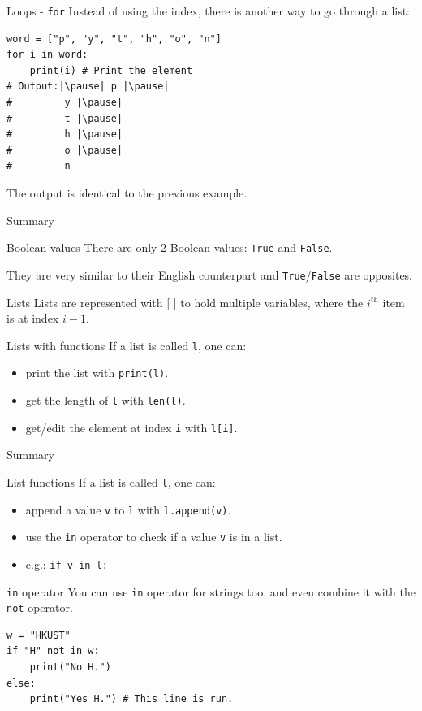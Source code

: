 \documentclass[dvipsnames, svgnames, x11names]{beamer}
\begin{document}
\begin{frame}[fragile]{Loops - \texttt{for}}
Instead of using the index, there is another way to go through a list:
\begin{verbatim}
word = ["p", "y", "t", "h", "o", "n"]
for i in word:
    print(i) # Print the element
# Output:|\pause| p |\pause|
#         y |\pause|
#         t |\pause|
#         h |\pause|
#         o |\pause|
#         n
\end{verbatim}
\pause The output is identical to the previous example.
\end{frame}

\begin{frame}[fragile]{Summary}
\begin{block}{Boolean values}
There are only 2 Boolean values: \texttt{True} and \texttt{False}.

They are very similar to their English counterpart and \texttt{True}/\texttt{False} are opposites.
\end{block}
\begin{block}{Lists}
Lists are represented with [ ] to hold multiple variables, where the $i^{\text{th}}$ item is at index $i - 1$.\\
\end{block}
\begin{block}{Lists with functions}
If a list is called \texttt{l}, one can:
\begin{itemize}
    \item print the list with \texttt{print(l)}.
    \item get the length of \texttt{l} with \texttt{len(l)}.
    \item get/edit the element at index \texttt{i} with \texttt{l[i]}.
\end{itemize}
\end{block}
\end{frame}

\begin{frame}[fragile]{Summary}
\begin{block}{List functions}
If a list is called \texttt{l}, one can:
\begin{itemize}
    \item append a value \texttt{v} to \texttt{l} with \texttt{l.append(v)}.
    \item use the \texttt{in} operator to check if a value \texttt{v} is in a list.
    \item[] e.g.: \texttt{if v in l:}
\end{itemize}
\end{block}

\begin{block}{\texttt{in} operator}
You can use \texttt{in} operator for strings too, and even combine it with the \texttt{not} operator.
\begin{verbatim}
w = "HKUST"
if "H" not in w:
    print("No H.")
else:
    print("Yes H.") # This line is run.
\end{verbatim}
\end{block}
\end{frame}
\end{document}
